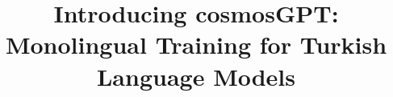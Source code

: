 \documentclass[conference]{IEEEtran}
\begin{document}
\title{Introducing cosmosGPT: Monolingual Training for Turkish Language Models}

\end{document}

